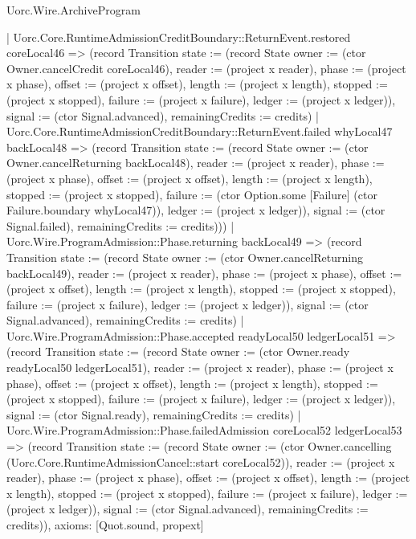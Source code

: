 \begin{lexlean}{Uorc.Wire.ArchiveProgram}
\begin{semanticmodule}
{      | Uorc.Core.RuntimeAdmissionCreditBoundary::ReturnEvent.restored coreLocal46 => (record Transition {state := (record State {owner := (ctor Owner.cancelCredit coreLocal46), reader := (project x reader), phase := (project x phase), offset := (project x offset), length := (project x length), stopped := (project x stopped), failure := (project x failure), ledger := (project x ledger)}), signal := (ctor Signal.advanced), remainingCredits := credits})
      | Uorc.Core.RuntimeAdmissionCreditBoundary::ReturnEvent.failed whyLocal47 backLocal48 => (record Transition {state := (record State {owner := (ctor Owner.cancelReturning backLocal48), reader := (project x reader), phase := (project x phase), offset := (project x offset), length := (project x length), stopped := (project x stopped), failure := (ctor Option.some [Failure] (ctor Failure.boundary whyLocal47)), ledger := (project x ledger)}), signal := (ctor Signal.failed), remainingCredits := credits})))
    | Uorc.Wire.ProgramAdmission::Phase.returning backLocal49 => (record Transition {state := (record State {owner := (ctor Owner.cancelReturning backLocal49), reader := (project x reader), phase := (project x phase), offset := (project x offset), length := (project x length), stopped := (project x stopped), failure := (project x failure), ledger := (project x ledger)}), signal := (ctor Signal.advanced), remainingCredits := credits})
    | Uorc.Wire.ProgramAdmission::Phase.accepted readyLocal50 ledgerLocal51 => (record Transition {state := (record State {owner := (ctor Owner.ready readyLocal50 ledgerLocal51), reader := (project x reader), phase := (project x phase), offset := (project x offset), length := (project x length), stopped := (project x stopped), failure := (project x failure), ledger := (project x ledger)}), signal := (ctor Signal.ready), remainingCredits := credits})
    | Uorc.Wire.ProgramAdmission::Phase.failedAdmission coreLocal52 ledgerLocal53 => (record Transition {state := (record State {owner := (ctor Owner.cancelling (Uorc.Core.RuntimeAdmissionCancel::start coreLocal52)), reader := (project x reader), phase := (project x phase), offset := (project x offset), length := (project x length), stopped := (project x stopped), failure := (project x failure), ledger := (project x ledger)}), signal := (ctor Signal.advanced), remainingCredits := credits})),
  axioms: [Quot.sound, propext]
}


\end{semanticmodule}
\end{lexlean}
